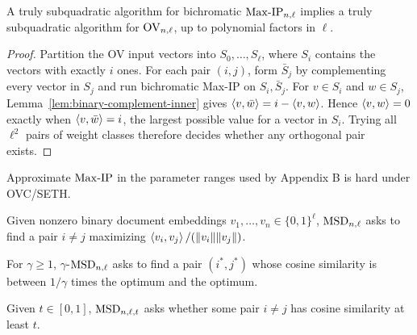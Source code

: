 \begin{lemma}
  \label{lem:bichromatic-maxip-hard-ov}
  A truly subquadratic algorithm for bichromatic $\mathrm{Max\mbox{-}IP}_{n,\ell}$ implies a
  truly subquadratic algorithm for $\mathrm{OV}_{n,\ell}$, up to polynomial factors in
  $\ell$.
\end{lemma}
\begin{proof}
  Partition the OV input vectors into $S_0,\ldots,S_\ell$, where $S_i$ contains
  the vectors with exactly $i$ ones.  For each pair $(i,j)$, form
  $\bar S_j$ by complementing every vector in $S_j$ and run bichromatic Max-IP on
  $S_i,\bar S_j$.  For $v\in S_i$ and $w\in S_j$,
  Lemma~\ref{lem:binary-complement-inner} gives
  $\left\langle v,\bar w\right\rangle=i-\left\langle v,w\right\rangle$.  Hence $\left\langle v,w\right\rangle=0$ exactly when
  $\left\langle v,\bar w\right\rangle=i$, the largest possible value for a vector in $S_i$.  Trying
  all $\ell^2$ pairs of weight classes therefore decides whether any
  orthogonal pair exists.
\end{proof}

\begin{theorem}
  \label{thm:km-approx-maxip-hardness}
  \notready
  Approximate $\mathrm{Max\mbox{-}IP}$ in the parameter ranges used by Appendix B is hard under
  OVC/SETH.
\end{theorem}

\begin{definition}
  \label{def:msd}
  Given nonzero binary document embeddings $v_1,\ldots,v_n\in\{0,1\}^{\ell}$,
  $\mathrm{MSD}_{n,\ell}$ asks to find a pair $i\neq j$ maximizing
  $\left\langle v_i,v_j\right\rangle/(\|v_i\|\|v_j\|)$.
\end{definition}

\begin{definition}
  \label{def:gamma-msd}
  For $\gamma\geq 1$, $\gamma$-$\mathrm{MSD}_{n,\ell}$ asks to find a pair
  $(i^*,j^*)$ whose cosine similarity is between $1/\gamma$ times the optimum
  and the optimum.
\end{definition}

\begin{definition}
  \label{def:msd-decision}
  Given $t\in[0,1]$, $\mathrm{MSD}_{n,\ell,t}$ asks whether some pair $i\neq j$ has
  cosine similarity at least $t$.
\end{definition}

